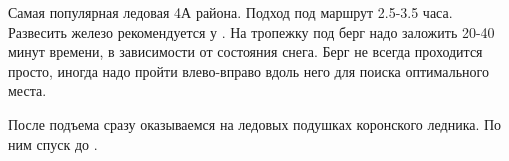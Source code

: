 Самая популярная ледовая 4А района. Подход под маршрут 2.5-3.5 часа.
Развесить железо рекомендуется у
. На тропежку под
берг надо заложить 20-40 минут времени, в зависимости от состояния
снега. Берг не всегда проходится просто, иногда надо пройти
влево-вправо вдоль него для поиска оптимального места.


После подъема сразу оказываемся на ледовых подушках коронского
ледника. По ним спуск до .
